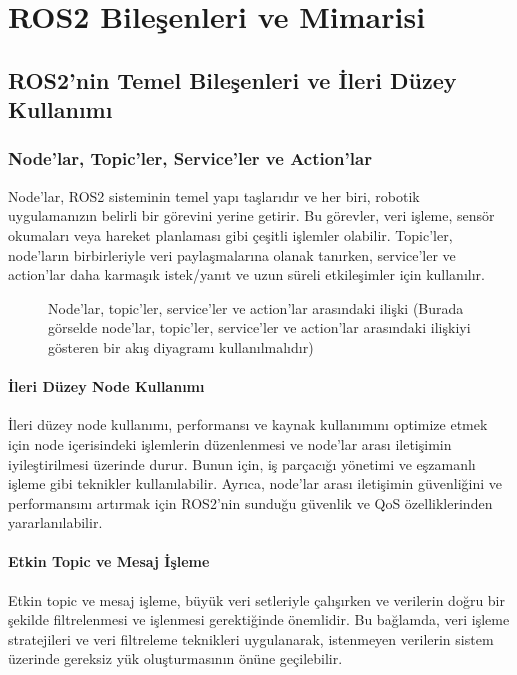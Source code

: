\chapter{ROS2 Bileşenleri ve Mimarisi}

\section{ROS2'nin Temel Bileşenleri ve İleri Düzey Kullanımı}
\subsection{Node'lar, Topic'ler, Service'ler ve Action'lar}
Node'lar, ROS2 sisteminin temel yapı taşlarıdır ve her biri, robotik uygulamanızın belirli bir görevini yerine getirir. Bu görevler, veri işleme, sensör okumaları veya hareket planlaması gibi çeşitli işlemler olabilir. Topic'ler, node'ların birbirleriyle veri paylaşmalarına olanak tanırken, service'ler ve action'lar daha karmaşık istek/yanıt ve uzun süreli etkileşimler için kullanılır.

\begin{figure}[h]
\centering
\caption{Node'lar, topic'ler, service'ler ve action'lar arasındaki ilişki (Burada görselde node'lar, topic'ler, service'ler ve action'lar arasındaki ilişkiyi gösteren bir akış diyagramı kullanılmalıdır)}
\end{figure}

\subsubsection{İleri Düzey Node Kullanımı}
İleri düzey node kullanımı, performansı ve kaynak kullanımını optimize etmek için node içerisindeki işlemlerin düzenlenmesi ve node'lar arası iletişimin iyileştirilmesi üzerinde durur. Bunun için, iş parçacığı yönetimi ve eşzamanlı işleme gibi teknikler kullanılabilir. Ayrıca, node'lar arası iletişimin güvenliğini ve performansını artırmak için ROS2'nin sunduğu güvenlik ve QoS özelliklerinden yararlanılabilir.


\subsubsection{Etkin Topic ve Mesaj İşleme}
Etkin topic ve mesaj işleme, büyük veri setleriyle çalışırken ve verilerin doğru bir şekilde filtrelenmesi ve işlenmesi gerektiğinde önemlidir. Bu bağlamda, veri işleme stratejileri ve veri filtreleme teknikleri uygulanarak, istenmeyen verilerin sistem üzerinde gereksiz yük oluşturmasının önüne geçilebilir.

